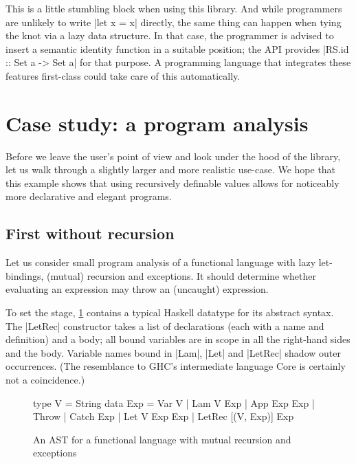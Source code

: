\documentclass[manuscript,screen,acmsmall,nonacm]{acmart}
\begin{document}
This is a little stumbling block when using this library. And while programmers are unlikely to write |let x = x| directly, the same thing can happen when tying the knot via a lazy data structure. In that case, the programmer is advised to insert a semantic identity function in a suitable position; the API provides |RS.id :: Set a -> Set a| for that purpose.
A programming language that integrates these features first-class could take care of this automatically.

\section{Case study: a program analysis}\label{sec:casestudy}

Before we leave the user's point of view and look under the hood of the library, let us walk through a slightly larger and more realistic use-case. We hope that this example shows that using recursively definable values allows for noticeably more declarative and elegant programs.

\subsection{First without recursion}

Let us consider small program analysis of a functional language with lazy let-bindings, (mutual) recursion and exceptions. It should determine whether evaluating an expression may throw an (uncaught) expression.

To set the stage, \cref{fig:analast} contains a typical Haskell datatype for its abstract syntax. The |LetRec| constructor takes a list of declarations (each with a name and definition) and a body; all bound variables are in scope in all the right-hand sides and the body.
Variable names bound in |Lam|, |Let| and |LetRec| shadow outer occurrences. (The resemblance to GHC's intermediate language Core \citep{secrets} is certainly not a coincidence.)

\begin{figure}
\setlength{\abovedisplayskip}{0pt}%
\setlength{\belowdisplayskip}{0pt}%
\begin{code}
type V    =  String
data Exp  =  Var V | Lam V Exp | App Exp Exp | Throw | Catch Exp
          |  Let V Exp Exp | LetRec [(V, Exp)] Exp
\end{code}
\caption{An AST for a functional language with mutual recursion and exceptions}
\label{fig:analast}
\end{figure}
\end{document}
